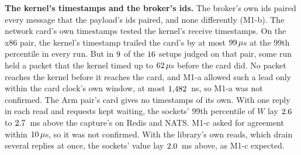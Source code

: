 \documentclass[10pt,journal,onecolumn]{IEEEtran}
\newcommand{\redis}{Redis}
\begin{document}
\begin{table}[tb]
\caption{\textbf{Every prediction of plan versions 47 and 49, and its verdict.} The point is the
part of the general method that the prediction tests (Section~\ref{P-sec:toolside}): 1, the
kernel's timestamps and the broker's ids; 2, the check for a waiting request; 3, the three
latencies; 4, the remedy by protocol. A tail is a quantity's mean over the $1\%$ of a load
state's messages with the largest $W$, a ratio is the tail with the load on over the tail with it
off, and $\beta$ is the bound of the check for a waiting request. Generated at build time from the judges' committed verdicts
and their own thresholds; each plan's design gives every prediction in full.}
\label{stab:gmverdicts}
\centering
\scriptsize

\end{table}

\textbf{The kernel's timestamps and the broker's ids.} The broker's own ids paired every message
that the payload's ids paired, and none differently (M1-b). The network card's own timestamps
tested the kernel's receive timestamps. On the x86 pair, the kernel's timestamp trailed the card's
by at most $99\,\mu$s at the 99th percentile in every run. But in $9$ of
the $16$ setups judged on that pair, some run held a packet that the kernel timed up to
$62\,\mu$s before the card did. No packet reaches the kernel before it reaches the
card, and M1-a allowed such a lead only within the card clock's own window, at most
$1{,}482$~ns, so M1-a was not confirmed. The Arm pair's card gives no timestamps of its
own. With one reply in each read and requests kept waiting, the sockets' 99th percentile of $W$
lay $2.6$ to $2.7$~ms above the capture's on \redis{} and NATS. M1-c asked for
agreement within $10\,\mu$s, so it was not confirmed. With the library's own reads,
which drain several replies at once, the sockets' value lay $2.0$~ms above, as M1-c
expected.
\end{document}
